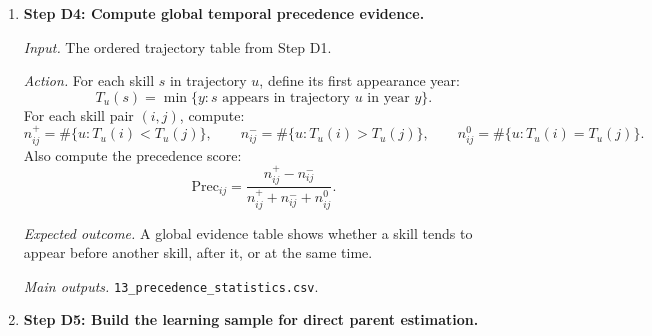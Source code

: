 \begin{enumerate}
    \textit{Input.} The time-layered node table from Step D2.

    \textit{Action.} For each pair of nodes within the same trajectory, classify the relation as:
    \begin{itemize}
        \item earlier-to-later;
        \item same year and same class;
        \item same year and different class;
        \item reverse-time impossible.
    \end{itemize}
    Only earlier-to-later pairs enter the prerequisite candidate set.
    Same-time pairs are routed to a separate co-requisite layer.
    Reverse-time pairs are excluded.
    If a validated within-year order variable exists, same-year pairs may be reclassified into
    earlier-to-later within the year.

    \textit{Expected outcome.} The directed branch contains only temporally admissible candidate
    edges, while same-time relations are preserved without being forced into arbitrary direction.

    \textit{Main outputs.}
    \texttt{12\_prerequisite\_candidates.csv},
    \texttt{12\_corequisite\_candidates.csv}.

    \item \textbf{Step D4: Compute global temporal precedence evidence.}

    \textit{Input.} The ordered trajectory table from Step D1.

    \textit{Action.} For each skill $s$ in trajectory $u$, define its first appearance year:
    \[
    T_u(s) = \min\{y : s \text{ appears in trajectory } u \text{ in year } y\}.
    \]
    For each skill pair $(i,j)$, compute:
    \[
    n^+_{ij} = \#\{u : T_u(i) < T_u(j)\}, \qquad
    n^-_{ij} = \#\{u : T_u(i) > T_u(j)\}, \qquad
    n^0_{ij} = \#\{u : T_u(i) = T_u(j)\}.
    \]
    Also compute the precedence score:
    \[
    \mathrm{Prec}_{ij}
    =
    \frac{n^+_{ij} - n^-_{ij}}{n^+_{ij} + n^-_{ij} + n^0_{ij}}.
    \]

    \textit{Expected outcome.} A global evidence table shows whether a skill tends to appear
    before another skill, after it, or at the same time.

    \textit{Main outputs.}
    \texttt{13\_precedence\_statistics.csv}.

    \item \textbf{Step D5: Build the learning sample for direct parent estimation.}


\end{enumerate}
